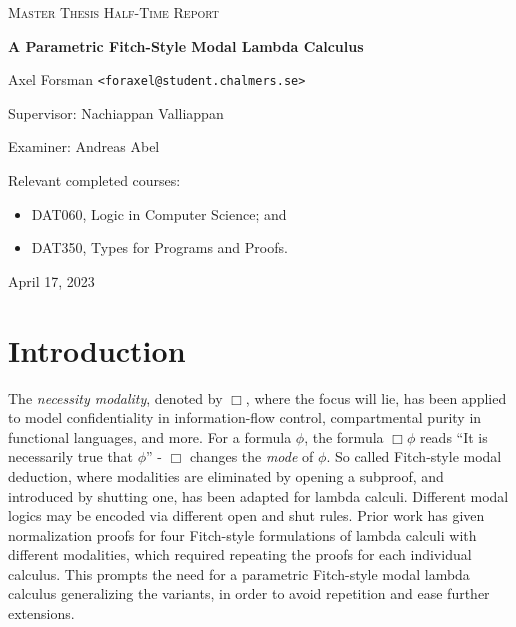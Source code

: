 \documentclass{article}
\begin{document}
\begin{titlepage}\centering

{\scshape\LARGE Master Thesis Half-Time Report\\}

\vspace{0.5cm}

{\huge\bfseries A Parametric Fitch-Style Modal Lambda Calculus\\}

\vspace{2cm}

{\Large Axel Forsman \texttt{<foraxel@student.chalmers.se>} \\}

\vspace{1.0cm}

{\large Supervisor: Nachiappan Valliappan \\}

\vspace{1.0cm}

{\large Examiner: Andreas Abel \\}

\vspace{1.5cm}

{\large Relevant completed courses:\par}

{\itshape \begin{itemize}
  \item DAT060, Logic in Computer Science; and
  \item DAT350, Types for Programs and Proofs.
  \end{itemize}}

\vfill
{\large April 17, 2023 \\}
\end{titlepage}

\section{Introduction}

The \emph{necessity modality}, denoted by $\Box$, where the focus will lie,
has been applied to model confidentiality in information-flow control,
compartmental purity in functional languages,
and more.
For a formula $\phi$, the formula $\Box \phi$ reads
``It is necessarily true that $\phi$'' -
$\Box$ changes the \emph{mode} of $\phi$.
So called Fitch-style modal deduction,
where modalities are eliminated by opening a subproof,
and introduced by shutting one,
has been adapted for lambda calculi.
Different modal logics may be encoded via different open and shut rules.
Prior work \cite{valliappan22} has given normalization proofs
for four Fitch-style formulations of lambda calculi with different modalities,
which required repeating the proofs for each individual calculus.
This prompts the need for a parametric Fitch-style modal lambda calculus
generalizing the variants,
in order to avoid repetition and ease further extensions.
\end{document}
